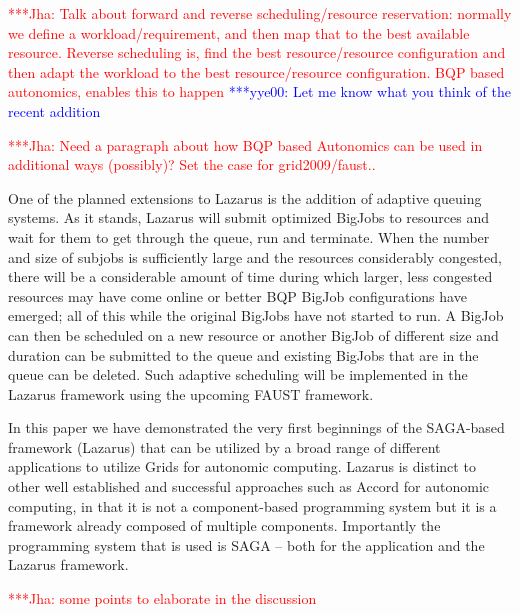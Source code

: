 \documentclass[conference,final]{IEEEtran}
\newcommand{\jhanote}[1]{ {\textcolor{red} { ***Jha: #1 }}}
\newcommand{\yyenote}[1]{ {\textcolor{blue} { ***yye00: #1 }}}
\newcommand{\jhanote}[1]{}
\newcommand{\yyenote}[1]{}
\begin{document}
\jhanote{Talk about forward and reverse scheduling/resource
  reservation: normally we define a workload/requirement, and then map
  that to the best available resource. Reverse scheduling is, find the
  best resource/resource configuration and then adapt the workload to
  the best resource/resource configuration. BQP based autonomics,
  enables this to happen}
\yyenote{Let me know what you think of the recent addition}

\jhanote{Need a paragraph about how BQP based Autonomics can be used
  in additional ways (possibly)? Set the case for grid2009/faust..}

One of the planned extensions to Lazarus is the addition of adaptive
queuing systems. As it stands, Lazarus will submit optimized BigJobs
to resources and wait for them to get through the queue, run and
terminate.  When the number and size of subjobs is sufficiently large
and the resources considerably congested, there will be a considerable
amount of time during which larger, less congested resources may have
come online or better BQP BigJob configurations have emerged; all of
this while the original BigJobs have not started to run. A BigJob can
then be scheduled on a new resource or another BigJob of different
size and duration can be submitted to the queue and existing BigJobs
that are in the queue can be deleted.  Such adaptive scheduling will
be implemented in the Lazarus framework using the upcoming FAUST
framework.


In this paper we have demonstrated the very first beginnings of the
SAGA-based framework (Lazarus) that can be utilized by a broad range
of different applications to utilize Grids for autonomic computing.
Lazarus is distinct to other well established and successful
approaches such as Accord for autonomic computing, in that it is not a
component-based programming system but it is a framework already
composed of multiple components. Importantly the programming system
that is used is SAGA -- both for the application and the Lazarus
framework.

\jhanote{some points to elaborate in the discussion}
\end{document}
